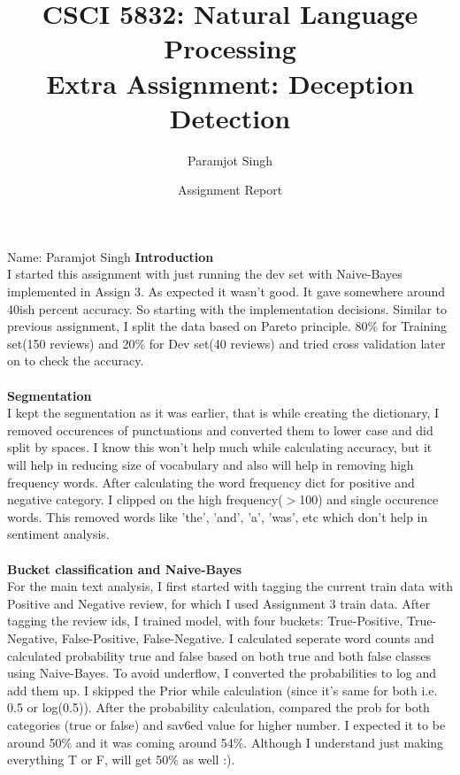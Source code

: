 \documentclass[addpoints,12pt]{exam}
\title{CSCI 5832: Natural Language Processing\\Extra Assignment: Deception Detection}
\date{Assignment Report}
\author{Paramjot Singh}
\begin{document}
\maketitle

\pagestyle{headandfoot}
\runningheadrule
{}
              {}
              {Name: Paramjot Singh}
              \firstpagefooter{}{}{}
              \runningfooter{}{}{}
\textbf{Introduction}\\
I started this assignment with just running the dev set with Naive-Bayes implemented in Assign 3. As expected it wasn't good. It gave somewhere around 40ish percent accuracy.
So starting with the implementation decisions. Similar to previous assignment, I split the data based on Pareto principle. 80\% for Training set(150 reviews) and 20\% for Dev set(40 reviews) and tried cross validation later on to check the accuracy.
\\ \\
\textbf{Segmentation}\\
I kept the segmentation as it was earlier, that is while creating the dictionary, I removed occurences of punctuations and converted them to lower case and did split by spaces. I know this won't help much while calculating accuracy, but it will help in reducing size of vocabulary and also will help in removing high frequency words.
After calculating the word frequency dict for positive and negative category. I clipped on the high frequency($>$100) and single occurence words. This removed words like 'the', 'and', 'a', 'was', etc which don't help in sentiment analysis.\\ \\
\textbf{Bucket classification and Naive-Bayes}\\
For the main text analysis, I first started with tagging the current train data with Positive and Negative review, for which I used Assignment 3 train data. After tagging the review ids, I trained model, with four buckets: True-Positive, True-Negative, False-Positive, False-Negative. I calculated seperate word counts and calculated probability true and false based on both true and both false classes using Naive-Bayes. To avoid underflow, I converted the probabilities to log and add them up. I skipped the Prior while calculation (since it's same for both i.e. 0.5 or log(0.5)). After the probability calculation, compared the prob for both categories (true or false) and sav6ed value for higher number. 
I expected it to be around 50\% and it was coming around 54\%. Although I understand just making everything T or F, will get 50\% as well :).\\ \\
\end{document}
